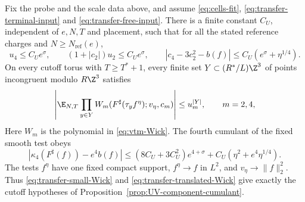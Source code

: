 \begin{proposition}\label{prop:transfer-UV-inputs}
Fix the probe and the scale data above, and assume
\eqref{eq:cells-fit}, \eqref{eq:transfer-terminal-input} and \eqref{eq:transfer-free-input}.
There is a finite
constant $C_U$, independent of $e,N,T$ and placement,
such that for all the stated reference charges and
$N\ge N_{\mathrm{ref}}(e)$,
\begin{equation}\label{eq:transfer-small-Wick}
 u_4\le C_Ue^\sigma,\qquad
 (1+|c_2|)u_2\le C_Ue^\sigma,\qquad
 |c_4-3c_2^2-b(f)|\le C_U(e^\sigma+\eta^{1/4}).
\end{equation}
On every cutoff torus with $T\ge T^*+1$, every finite
set $Y\subset(R^*/L)\Z^3$ of points incongruent
modulo $R\Z^3$ satisfies
\begin{equation}\label{eq:transfer-translated-Wick}
 \left|\E_{N,T}\prod_{y\in Y}
       W_m(F^\sharp(\tau_yf^\eta);v_\eta,c_m)\right|
                          \le u_m^{|Y|},\qquad m=2,4,
\end{equation}
Here $W_m$ is the polynomial in \eqref{eq:vtm-Wick}.
The fourth cumulant of the fixed smooth test obeys
\begin{equation}\label{eq:transfer-smooth-cumulant}
 |\kappa_4(F^\sharp(f))-e^4b(f)|
 \le(8C_U+3C_U^2)e^{4+\sigma}
                  +C_U(\eta^2+e^4\eta^{1/4}).
\end{equation}
The tests $f^\eta$ have one fixed compact support,
$f^\eta\to f$ in $L^2$, and $v_\eta\to\|f\|_2^2$.
Thus \eqref{eq:transfer-small-Wick} and
\eqref{eq:transfer-translated-Wick} give exactly the
cutoff hypotheses of Proposition~\ref{prop:UV-component-cumulant}.
\end{proposition}

